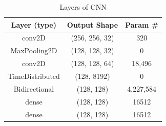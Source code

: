 \documentclass[11pt,a4paper]{scrartcl}
\begin{document}
\begin{table}[h]
\centering
\begin{tabular}{ccc}
\toprule
\textbf{Layer (type)} & \textbf{Output Shape} & \textbf{Param \#} \\
\midrule
conv2D & (256, 256, 32) & 320 \\
MaxPooling2D & (128, 128, 32) & 0 \\
conv2D & (128, 128, 64) & 18,496 \\
TimeDistributed & (128, 8192) & 0 \\
Bidirectional & (128, 128) & 4,227,584 \\
dense & (128, 128) & 16512 \\
dense & (128, 128) & 16512 \\
\bottomrule
\end{tabular}
\caption{Layers of CNN}
\end{table}

\printbibliography[]
\vfill
\end{document}
